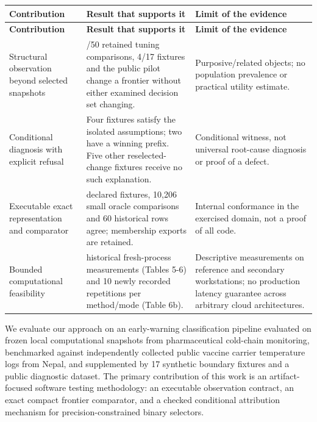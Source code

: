 \documentclass[11pt,a4paper]{article}
\begin{document}
{\footnotesize
\setlength{\tabcolsep}{3pt}
\renewcommand{\arraystretch}{1.15}
\begin{longtable}{>{\raggedright\arraybackslash}p{0.26005\dimexpr\textwidth-6\tabcolsep\relax}>{\raggedright\arraybackslash}p{0.41998\dimexpr\textwidth-6\tabcolsep\relax}>{\raggedright\arraybackslash}p{0.31997\dimexpr\textwidth-6\tabcolsep\relax}}
\toprule
\textbf{Contribution} & \textbf{Result that supports it} & \textbf{Limit of the evidence} \\
\midrule
\endfirsthead
\toprule
\textbf{Contribution} & \textbf{Result that supports it} & \textbf{Limit of the evidence} \\
\midrule
\endhead
Structural observation beyond selected snapshots & 18/50 retained tuning comparisons, 4/17 fixtures and the public pilot change a frontier without either examined decision set changing. & Purposive/related objects; no population prevalence or practical utility estimate. \\
Conditional diagnosis with explicit refusal & Four fixtures satisfy the isolated assumptions; two have a winning prefix. Five other reselected-change fixtures receive no such explanation. & Conditional witness, not universal root-cause diagnosis or proof of a defect. \\
Executable exact representation and comparator & 17 declared fixtures, 10,206 small oracle comparisons and 60 historical rows agree; membership exports are retained. & Internal conformance in the exercised domain, not a proof of all code. \\
Bounded computational feasibility & 54 historical fresh-process measurements (Tables 5-6) and 10 newly recorded repetitions per method/mode (Table 6b). & Descriptive measurements on reference and secondary workstations; no production latency guarantee across arbitrary cloud architectures. \\
\bottomrule
\end{longtable}
}
We evaluate our approach on an early-warning classification pipeline evaluated on frozen local computational snapshots from pharmaceutical cold-chain monitoring, benchmarked against independently collected public vaccine carrier temperature logs from Nepal, and supplemented by 17 synthetic boundary fixtures and a public diagnostic dataset. The primary contribution of this work is an artifact-focused software testing methodology: an executable observation contract, an exact compact frontier comparator, and a checked conditional attribution mechanism for precision-constrained binary selectors.
\end{document}
